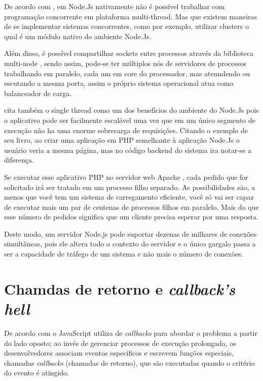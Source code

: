   De acordo com , em Node.Js nativamente não é possível trabalhar com programação 
  concorrente em plataforma multi-thread. Mas que existem maneiras de se implementar sistemas concorrentes, 
  como por exemplo, utilizar clusters o qual é um módulo nativo do ambiente Node.Js.
  
  Além disso, é possível compartilhar sockets entre processos através da biblioteca multi-node ,
  sendo assim, pode-se ter múltiplos nós de servidores de processos trabalhando em paralelo, 
  cada um em core do processador, mas atenndendo ou escutando a mesma porta, assim o próprio sistema operacional
  atua como balanceador de carga.\cite{Junior:2012}
  
  \cite{Powers:2012} cita também o single thread como um dos benefícios do ambiente do Node.Js 
  pois o aplicativo pode ser facilmente escalável uma vez que em um único segmento de execução não ha uma enorme 
  sobrecarga de requisições. Citando o exemplo de seu livro, ao criar uma aplicação em \ac{PHP} semelhante 
  à aplicação Node.Js o usuário veria a mesma página, mas no código backend do sistema ira notar-se a diferença.
  
  Se executar esse aplicativo \ac{PHP} no servidor web Apache , cada pedido que for solicitado irá ser tratado 
  em um processo filho separado. As possibilidades são, a menos que você tem um sistema de carregamento eficiente, 
  você só vai ser capaz de executar mais um par de centenas de processos filhos em paralelo. 
  Mais do que esse número de pedidos significa que um cliente precisa esperar por uma resposta.\cite{Powers:2012}
  
  Deste modo, um servidor Node.js pode suportar dezenas de milhares de conexões simultâneas, 
  pois ele altera todo o contexto do servidor e o único gargalo passa a ser a capacidade de tráfego 
  de um sistema e não mais o número de conexões.\cite{Abernethy:2011}
  
\section{Chamdas de retorno e \textit{callback's hell}}
\label{chamadas-de-retorno-e-callback-hell}

  De acordo com  o JavaScript utiliza de \textit{callbacks}
  para abordar o problema a  partir do lado oposto; ao invés de gerenciar processos de execução prolongada, 
  os desenvolvedores associam eventos específicos e escrevem funções especiais, chamadas \textit{callbacks}
  (chamadas de retorno), que são executadas quando o critério do evento é atingido.

